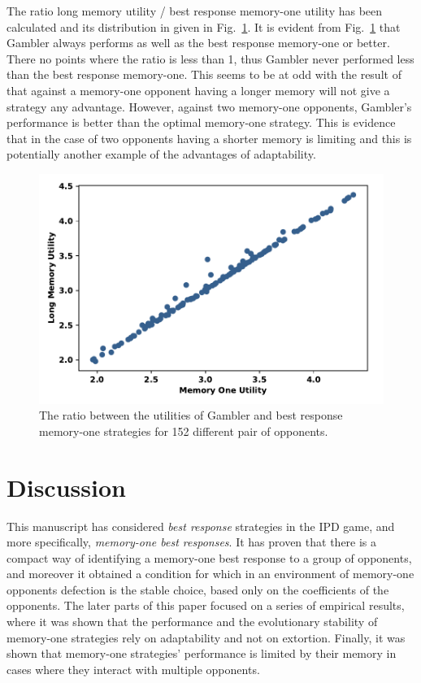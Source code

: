 \documentclass[9pt,twocolumn,twoside,lineno]{pnas-new}
\begin{document}
The ratio long memory utility / best response memory-one utility has been calculated and its distribution in
given in Fig.~\ref{fig:utilities_gambler_mem_one}.
It is evident from Fig.~\ref{fig:utilities_gambler_mem_one} that
Gambler always performs as well as the best response memory-one or better. There
no points where the ratio is less than 1, thus Gambler never performed less
than the best response memory-one. This seems to be at odd with the
result of~\cite{Press2012} that against a memory-one opponent having a longer memory
will not give a strategy any
advantage. However, against two memory-one opponents, Gambler's performance is better than
the optimal memory-one strategy. This is evidence that in the case of two opponents having a
shorter memory is limiting and this is potentially another example of the advantages
of adaptability.

\begin{figure}[!htbp]
    \centering
    \includegraphics[width=.45\textwidth]{gambler_performance_against_mem_one.pdf}
    \caption{The ratio between the utilities of Gambler and best response memory-one
    strategies for 152 different pair of opponents.}\label{fig:utilities_gambler_mem_one}
\end{figure}

\section*{Discussion}
This manuscript has considered \textit{best response} strategies in the IPD game, and
more specifically, \textit{memory-one best responses}. It has proven that there is
a compact way of identifying a memory-one best response to a group of opponents,
and moreover it obtained a condition for which in an
environment of memory-one opponents defection is the stable choice, based only
on the coefficients of the opponents.
The later parts of this paper focused on a series of empirical results, where it
was shown that the performance and the evolutionary stability of memory-one
strategies rely on adaptability and not on extortion. Finally, it was shown that
memory-one strategies' performance is limited by their memory in cases where
they interact with multiple opponents.
\end{document}
